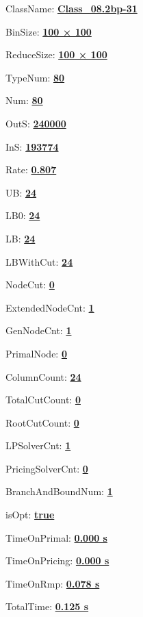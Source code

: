 \documentclass[11pt]{article}
\begin{document}
\pagestyle{empty}


ClassName: \underline{\textbf{Class_08.2bp-31}}
\par
BinSize: \underline{\textbf{100 × 100}}
\par
ReduceSize: \underline{\textbf{100 × 100}}
\par
TypeNum: \underline{\textbf{80}}
\par
Num: \underline{\textbf{80}}
\par
OutS: \underline{\textbf{240000}}
\par
InS: \underline{\textbf{193774}}
\par
Rate: \underline{\textbf{0.807}}
\par
UB: \underline{\textbf{24}}
\par
LB0: \underline{\textbf{24}}
\par
LB: \underline{\textbf{24}}
\par
LBWithCut: \underline{\textbf{24}}
\par
NodeCut: \underline{\textbf{0}}
\par
ExtendedNodeCnt: \underline{\textbf{1}}
\par
GenNodeCnt: \underline{\textbf{1}}
\par
PrimalNode: \underline{\textbf{0}}
\par
ColumnCount: \underline{\textbf{24}}
\par
TotalCutCount: \underline{\textbf{0}}
\par
RootCutCount: \underline{\textbf{0}}
\par
LPSolverCnt: \underline{\textbf{1}}
\par
PricingSolverCnt: \underline{\textbf{0}}
\par
BranchAndBoundNum: \underline{\textbf{1}}
\par
isOpt: \underline{\textbf{true}}
\par
TimeOnPrimal: \underline{\textbf{0.000 s}}
\par
TimeOnPricing: \underline{\textbf{0.000 s}}
\par
TimeOnRmp: \underline{\textbf{0.078 s}}
\par
TotalTime: \underline{\textbf{0.125 s}}
\par
\newpage


\end{document}

